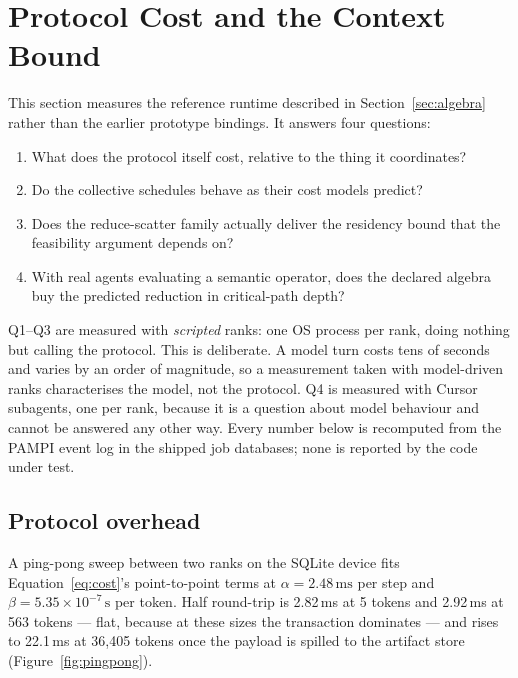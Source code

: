 
\section{Protocol Cost and the Context Bound}
\label{sec:eval-ampi}

This section measures the reference runtime described in
Section~\ref{sec:algebra} rather than the earlier prototype bindings.  It
answers four questions:

\begin{enumerate}[label=Q\arabic*.]
\item What does the protocol itself cost, relative to the thing it coordinates?
\item Do the collective schedules behave as their cost models predict?
\item Does the reduce-scatter family actually deliver the residency bound that
the feasibility argument depends on?
\item With real agents evaluating a semantic operator, does the declared
algebra buy the predicted reduction in critical-path depth?
\end{enumerate}

Q1--Q3 are measured with \emph{scripted} ranks: one OS process per rank, doing
nothing but calling the protocol.  This is deliberate.  A model turn costs tens
of seconds and varies by an order of magnitude, so a measurement taken with
model-driven ranks characterises the model, not the protocol.  Q4 is measured
with Cursor subagents, one per rank, because it is a question about model
behaviour and cannot be answered any other way.  Every number below is
recomputed from the PAMPI event log in the shipped job databases; none is
reported by the code under test.

\subsection{Protocol overhead}

A ping-pong sweep between two ranks on the SQLite device fits
Equation~\ref{eq:cost}'s point-to-point terms at
$\alpha = 2.48\,\mathrm{ms}$ per step and
$\beta = 5.35\times10^{-7}\,\mathrm{s}$ per token.  Half round-trip is
2.82\,ms at 5 tokens and 2.92\,ms at 563 tokens --- flat, because at these
sizes the transaction dominates --- and rises to 22.1\,ms at 36{,}405 tokens
once the payload is spilled to the artifact store (Figure~\ref{fig:pingpong}).

